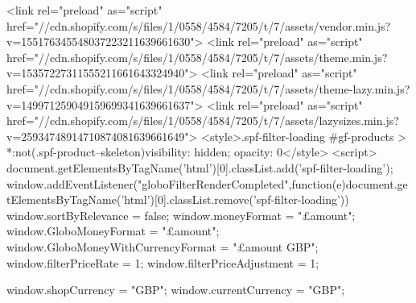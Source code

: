{{  <link rel="preload" as="script" href="//cdn.shopify.com/s/files/1/0558/4584/7205/t/7/assets/vendor.min.js?v=155176345548037223211639661630">
  <link rel="preload" as="script" href="//cdn.shopify.com/s/files/1/0558/4584/7205/t/7/assets/theme.min.js?v=15357227311555211661643324940">
  <link rel="preload" as="script" href="//cdn.shopify.com/s/files/1/0558/4584/7205/t/7/assets/theme-lazy.min.js?v=149971259049159699341639661637">
  <link rel="preload" as="script" href="//cdn.shopify.com/s/files/1/0558/4584/7205/t/7/assets/lazysizes.min.js?v=25934748914710874081639661649">
  <style>.spf-filter-loading #gf-products > *:not(.spf-product--skeleton){visibility: hidden; opacity: 0}</style>
<script>
  document.getElementsByTagName('html')[0].classList.add('spf-filter-loading');
  window.addEventListener("globoFilterRenderCompleted",function(e){document.getElementsByTagName('html')[0].classList.remove('spf-filter-loading')})
  window.sortByRelevance = false;
  window.moneyFormat = "£{{amount}}";
  window.GloboMoneyFormat = "£{{amount}}";
  window.GloboMoneyWithCurrencyFormat = "£{{amount}} GBP";
  window.filterPriceRate = 1;
  window.filterPriceAdjustment = 1;

  window.shopCurrency = "GBP";
  window.currentCurrency = "GBP";

}}
